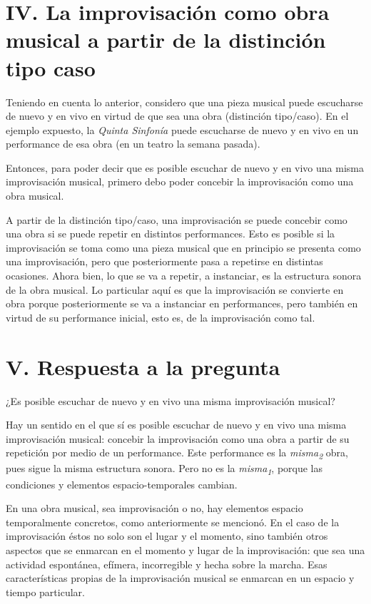 \documentclass[]{book}
\begin{document}
\section*{IV. La improvisación como obra musical a partir de la distinción
  tipo caso}


Teniendo en cuenta lo anterior, considero que una pieza musical puede
escucharse de nuevo y en vivo en virtud de que sea una obra (distinción
tipo/caso). En el ejemplo expuesto, la \emph{Quinta Sinfonía} puede
escucharse de nuevo y en vivo en un performance de esa obra (en un
teatro la semana pasada).

Entonces, para poder decir que es posible escuchar de nuevo y en vivo
una misma improvisación musical, primero debo poder concebir la
improvisación como una obra musical.

A partir de la distinción tipo/caso, una improvisación se puede concebir
como una obra si se puede repetir en distintos performances. Esto es
posible si la improvisación se toma como una pieza musical que en
principio se presenta como una improvisación, pero que posteriormente
pasa a repetirse en distintas ocasiones. Ahora bien, lo que se va a
repetir, a instanciar, es la estructura sonora de la obra musical. Lo
particular aquí es que la improvisación se convierte en obra porque
posteriormente se va a instanciar en performances, pero también en
virtud de su performance inicial, esto es, de la improvisación como tal.

\section*{V. Respuesta a la pregunta}

¿Es posible escuchar de nuevo y en vivo una misma improvisación musical?

Hay un sentido en el que sí es posible escuchar de nuevo y en vivo una
misma improvisación musical: concebir la improvisación como una obra a
partir \protect\hypertarget{_Hlk508741672}{}{}de su repetición por medio
de un performance. Este performance es la \emph{misma\textsubscript{2}}
obra, pues sigue la misma estructura sonora. Pero no es la
\emph{misma\textsubscript{1}}, porque las condiciones y elementos
espacio-temporales cambian.

En una obra musical, sea improvisación o no, hay elementos espacio
temporalmente concretos, como anteriormente se mencionó. En el caso de
la improvisación éstos no solo son el lugar y el momento, sino también
otros aspectos que se enmarcan en el momento y lugar de la
improvisación: que sea una actividad espontánea, efímera, incorregible y
hecha sobre la marcha. Esas características propias de la improvisación
musical se enmarcan en un espacio y tiempo particular.
\end{document}
